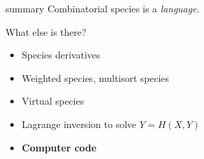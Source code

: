 \documentclass{beamer}
\begin{document}
\begin{frame}{summary}
Combinatorial species is a \emph{language}. \pause 

What else is there?
\begin{itemize}
  \item Species derivatives
  \item Weighted species, multisort species
  \item Virtual species
  \item Lagrange inversion to solve $Y = H(X,Y)$
  \item \textbf{Computer code}
\end{itemize}
\end{frame}
\end{document}
